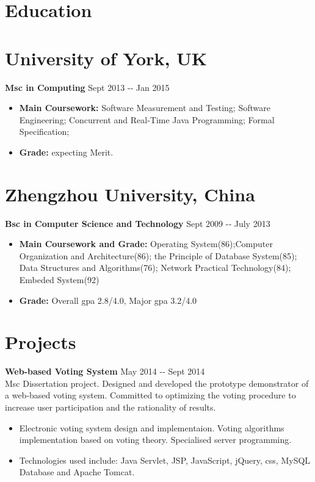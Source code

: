 \documentclass[margin]{res}
\begin{document}
  
\address{{\bf Present Address} \\ 37, Broadway west \\ 
York\\ YO10 4JN}
\address{{\bf Email Address} \\ fanlu91@gmail.com \\ {\bf Phone Number} \\
(044)7706 234389
}
\begin{resume} 
\section{Education} 
\section{University of York, UK} 
{\bf Msc in Computing } \hfill Sept
2013 -­‐ Jan 2015  \\
\begin{itemize}
  \item {\bf Main Coursework:} Software
  Measurement and Testing; Software Engineering; Concurrent and Real-Time Java Programming; Formal
Specification;
 \item  {\bf Grade:} expecting Merit.
\end{itemize}
\section{Zhengzhou University, China}  
{\bf Bsc in Computer Science and Technology } \hfill Sept 2009 -­‐ July 2013\\
\begin{itemize}
\item {\bf Main Coursework and Grade: } Operating System(86);Computer
Organization and Architecture(86); the Principle of Database System(85); Data
Structures and Algorithms(76); Network Practical Technology(84); Embeded
System(92)
\item {\bf Grade:} Overall gpa 2.8/4.0, Major gpa 3.2/4.0 
\end{itemize}
\section{Projects}
{\bf Web-based Voting System} \hfill May 2014 -­‐ Sept 2014\\
Msc Dissertation
project. Designed and developed the prototype demonstrator of a web-based voting
system. Committed to optimizing the voting procedure to increase user
participation and the rationality of results.
\begin{itemize}
  \item Electronic voting system design and implementaion. Voting algorithms
  implementation based on voting theory. Specialised server programming.
\item Technologies used
include: Java Servlet, JSP, JavaScript, jQuery, css, MySQL Database and Apache
Tomcat.
\end{itemize}


\end{resume}
\end{document}
